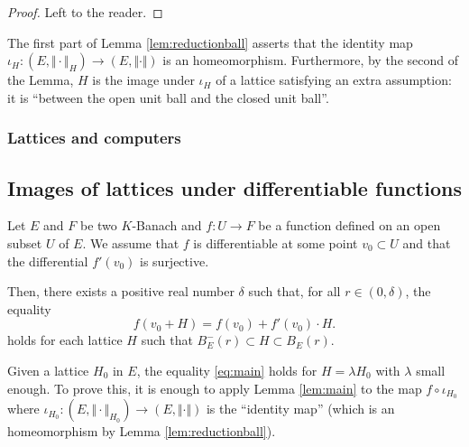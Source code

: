 \documentclass{lms}
\begin{document}
\begin{proof}
Left to the reader.
\end{proof}

The first part of Lemma \ref{lem:reductionball} asserts that the 
identity map $\iota_H : (E, \Vert \cdot \Vert_H) \to (E, \Vert \cdot 
\Vert)$ is an homeomorphism. Furthermore, by the second of the Lemma, 
$H$ is the image under $\iota_H$ of a lattice satisfying an extra 
assumption: it is ``between the open unit ball and the closed unit 
ball''.

\subsubsection*{Lattices and computers}


\subsection{Images of lattices under differentiable functions}

\begin{lem} \label{lem:main}
Let $E$ and $F$ be two $K$-Banach and $f : U 
\rightarrow F$ be a function defined on an open subset $U$ of $E$.
We assume that $f$ is differentiable at some point $v_0 \subset 
U$ and that the differential $f'(v_0)$ is surjective. 

Then, there exists a positive real number $\delta$ such that, for all $r 
\in (0, \delta)$, the equality
\begin{equation}
\label{eq:main}
f(v_0 + H) = f(v_0) + f'(v_0) \cdot H.
\end{equation}
holds for each lattice $H$ such that $B^-_E(r) \subset H \subset
B_E(r)$.
\end{lem}

\begin{rmk}
Given a lattice $H_0$ in $E$, the equality \eqref{eq:main} holds for $H 
= \lambda H_0$ with $\lambda$ small enough. To prove this, it is enough 
to apply Lemma \ref{lem:main} to the map $f \circ \iota_{H_0}$ where 
$\iota_{H_0} : (E, \Vert \cdot \Vert_{H_0}) \to (E, \Vert \cdot \Vert)$ 
is the ``identity map'' (which is an homeomorphism by Lemma 
\ref{lem:reductionball}).
\end{rmk}
\end{document}
